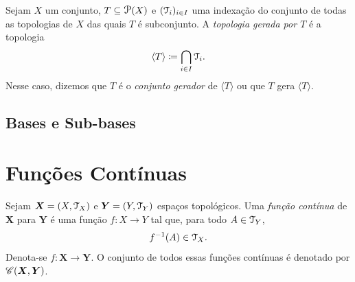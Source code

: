 \begin{defi}
	Sejam $X$ um conjunto, $T \subseteq \p(X)$ e $(\mathcal{T}_i)_{i \in I}$ uma indexação do conjunto de todas as topologias de $X$ das quais $T$ é subconjunto. A \emph{topologia gerada por $T$} é a topologia
	\begin{equation*}
	\langle T \rangle \coloneqq \bigcap_{i \in I} \topo_i.
	\end{equation*}
Nesse caso, dizemos que $T$ é o \emph{conjunto gerador} de $\langle T \rangle$ ou que $T$ gera $\langle T \rangle$.
\end{defi}

\section{Bases e Sub-bases}


\chapter{Funções Contínuas}

\begin{defi}
Sejam $\bm X = (X,\mathcal{T}_X)$ e $\bm Y = (Y,\mathcal{T}_Y)$ espaços topológicos. Uma \emph{função contínua} de $\bm X$ para $\bm Y$ é uma função $f: X \to Y$ tal que, para todo $A \in \mathcal{T}_Y$,
	\begin{equation*}
	f^{-1}(A) \in \mathcal{T}_X.
	\end{equation*}
Denota-se $f: \bm X \to \bm Y$. O conjunto de todos essas funções contínuas é denotado por $\mathscr{C}(\bm X,\bm Y)$.
\end{defi}

